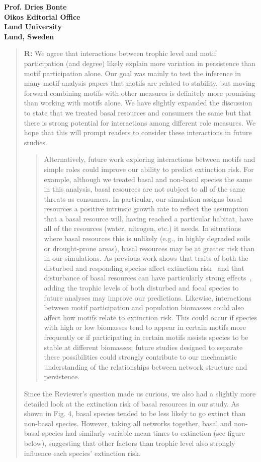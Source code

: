 \documentclass[12pt]{letter}
\begin{document}
\begin{letter}{\bf Prof. Dries Bonte\\
Oikos Editorial Office \\
Lund University \\
Lund, Sweden}
\begin{quotation}
    \smallskip

    \textbf{R:} We agree that interactions between trophic level and motif participation (and degree) likely explain more variation in persistence than motif participation alone. Our goal was mainly to test the inference in many motif-analysis papers that motifs are related to stability, but moving forward combining motifs with other measures is definitely more promising than working with motifs alone. We have slightly expanded the discussion to state that we treated basal resources and consumers the same but that there is strong potential for interactions among different role measures. We hope that this will prompt readers to consider these interactions in future studies.


    \begin{quotation}
        Alternatively, future work exploring interactions between motifs and simple roles could improve our ability to predict extinction risk.
        For example, although we treated basal and non-basal species the same in this analysis, basal resources are not subject to all of the same threats as consumers.
        In particular, our simulation assigns basal resources a positive intrinsic growth rate to reflect the assumption that a basal resource will, having reached a particular habitat, have all of the resources (water, nitrogen, etc.) it needs. 
        In situations where basal resources this is unlikely (e.g., in highly degraded soils or drought-prone areas), basal resources may be at greater risk than in our simulations.
        As previous work shows that traits of both the disturbed and responding species affect extinction risk~\citep{Wootton2016} and that disturbance of basal resources can have particularly strong effects~\citep{Scherber2010}, adding the trophic levels of both disturbed and focal species to future analyses may improve our predictions.
        Likewise, interactions between motif participation and population biomasses could also affect how motifs relate to extinction risk.
        This could occur if species with high or low biomasses tend to appear in certain motifs more frequently or if participating in certain motifs assists species to be stable at different biomasses; future studies designed to separate these possibilities could strongly contribute to our mechanistic understanding of the relationships between network structure and persistence.
    \end{quotation}


    Since the Reviewer's question made us curious, we also had a slightly more detailed look at the extinction risk of basal resources in our study.
    As shown in Fig. 4, basal species tended to be less likely to go extinct than non-basal species. However, taking all networks together, basal and non-basal species had similarly variable mean times to extinction (see figure below), suggesting that other factors than trophic level also strongly influence each species' extinction risk. 


\end{quotation}
\end{letter}
\end{document}
